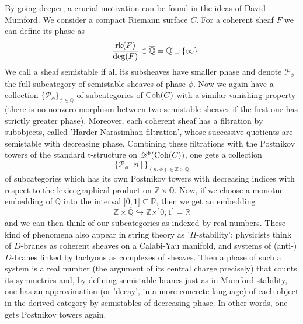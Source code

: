 By going deeper, a crucial motivation can be found in the ideas of David Mumford. We consider a compact Riemann surface $C$. For a coherent sheaf $F$ we can define its phase as $$- \frac{\textnormal{rk}(F)}{\textnormal{deg}(F)} \in \overline{\mathbb{Q}}=\mathbb{Q} \sqcup \{ \infty \}$$ 
We call a sheaf semistable if all its subsheaves have smaller phase and denote $\mathscr{P}_{\phi}$ the full subcategory of semistable sheaves of phase $\phi$. Now we again have a collection $\{ \mathscr{P}_{\phi} \}_{\phi \in \overline{\mathbb{Q}}}$ of subcategories of $\textnormal{Coh}(C)$ with a similar vanishing property (there is no nonzero morphism between two semistable sheaves if the first one has strictly greater phase). Moreover, each coherent sheaf has a filtration by subobjects, called 'Harder-Narasimhan filtration', whose successive quotients are semistable with decreasing phase. Combining these filtrations with the Postnikov towers of the standard t-structure on $\mathscr{D}^b(\textnormal{Coh}(C))$, one gets a collection $$\{ \mathscr{P}_{\phi}[n] \}_{(n,\phi) \in \mathbb{Z} \times \overline{\mathbb{Q}}}$$ of subcategories which has its own Postnikov towers with decreasing indices with respect to the lexicographical product on $\mathbb{Z} \times \overline{\mathbb{Q}}$. Now, if we choose a monotne embedding of $\overline{\mathbb{Q}}$ into the interval $]0,1] \subseteq \mathbb{R}$, then we get an embedding $$\mathbb{Z} \times \overline{\mathbb{Q}} \hookrightarrow \mathbb{Z} \times ]0,1] = \mathbb{R}$$ 
and we can then think of our subcategories as indexed by real numbers. These kind of phenomena also appear in string theory as '$\Pi$-stability': physicists think of $D$-branes as coherent sheaves on a Calabi-Yau manifold, and systems of (anti-)$D$-branes linked by tachyons as complexes of sheaves. Then a phase of such a system is a real number (the argument of its central charge precisely) that counts its symmetries and, by defining semistable branes just as in Mumford stability, one has an approximation (or 'decay', in a more concrete language) of each object in the derived category by semistables of decreasing phase. In other words, one gets Postnikov towers again.  \\

